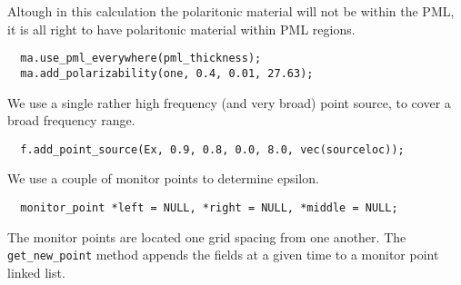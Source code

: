 \begin{comment}
const double a = 10;
const double pml_thickness = 1.0;
const double middlesize = 1.0;
const double zsize = middlesize + 2*pml_thickness;
\end{verbatim}

For our example polaritonic material, we'll use an $\epsilon(0)$ of 13.4. %

\begin{verbatim}
double eps(const vec &) { return 13.4; }
\end{verbatim}
\begin{comment}
double one(const vec &p) {
  return 1;
}

int main(int argc, char **argv) {
  initialize mpi(argc, argv);
  deal_with_ctrl_c();
  const double ttot =2000.0;
  const volume v = volone(zsize, a);
  const symmetry S = mirror(Z, v);
  mat ma(v, eps, 0, S);
  const char *dirname = make_output_directory(__FILE__);
  ma.set_output_directory(dirname);
\end{comment}
Altough in this calculation the polaritonic material will not be within the
PML, it is all right to have polaritonic material within PML regions.
\begin{verbatim}
  ma.use_pml_everywhere(pml_thickness);
  ma.add_polarizability(one, 0.4, 0.01, 27.63);
\end{verbatim}
\begin{comment}
  fields f(&ma);
  double sourceloc = pml_thickness+1.0/(double)a;
\end{comment}
We use a single rather high frequency (and very broad) point source, to
cover a broad frequency range.
\begin{verbatim}
  f.add_point_source(Ex, 0.9, 0.8, 0.0, 8.0, vec(sourceloc));
\end{verbatim}
We use a couple of monitor points to determine epsilon.
\begin{verbatim}
  monitor_point *left = NULL, *right = NULL, *middle = NULL;
\end{verbatim}
\begin{comment}
  double next_printtime = 100;
  while (f.time() <= ttot && !interrupt) {
    if (f.time() >= next_printtime) {
      next_printtime += 100;
      master_printf("Working on time %
      master_printf("energy is %
    }
\end{comment}
The monitor points are located one grid spacing from one another.  The
\verb*|get_new_point| method appends the fields at a given time to a
monitor point linked list.

